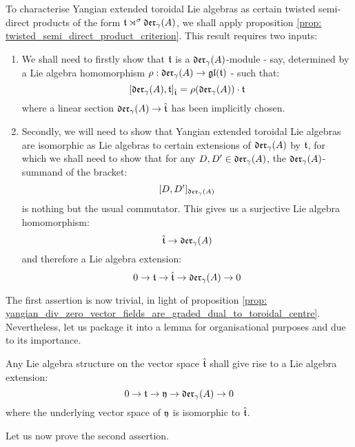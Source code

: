         To characterise Yangian extended toroidal Lie algebras as certain twisted semi-direct products of the form $\mathfrak{t} \rtimes^{\sigma} \mathfrak{der}_{\gamma}(A)$, we shall apply proposition \ref{prop: twisted_semi_direct_product_criterion}. This result requires two inputs:
        \begin{enumerate}
            \item We shall need to firstly show that $\mathfrak{t}$ is a $\mathfrak{der}_{\gamma}(A)$-module - say, determined by a Lie algebra homomorphism $\rho: \mathfrak{der}_{\gamma}(A) \to \mathfrak{gl}(\mathfrak{t})$ - such that:
                $$[\mathfrak{der}_{\gamma}(A), \mathfrak{t}]_{\hat{\mathfrak{t}}} = \rho(\mathfrak{der}_{\gamma}(A)) \cdot \mathfrak{t}$$
            where a linear section $\mathfrak{der}_{\gamma}(A) \to \hat{\mathfrak{t}}$ has been implicitly chosen.
            \item Secondly, we will need to show that Yangian extended toroidal Lie algebras are isomorphic as Lie algebras to certain extensions of $\mathfrak{der}_{\gamma}(A)$ by $\mathfrak{t}$, for which we shall need to show that for any $D, D' \in \mathfrak{der}_{\gamma}(A)$, the $\mathfrak{der}_{\gamma}(A)$-summand of the bracket:
                $$[D, D']_{\mathfrak{der}_{\gamma}(A)}$$
            is nothing but the usual commutator. This gives us a surjective Lie algebra homomorphism:
                $$\hat{\mathfrak{t}} \to \mathfrak{der}_{\gamma}(A)$$
            and therefore a Lie algebra extension:
                $$0 \to \mathfrak{t} \to \hat{\mathfrak{t}} \to \mathfrak{der}_{\gamma}(A) \to 0$$
        \end{enumerate}

        The first assertion is now trivial, in light of proposition \ref{prop: yangian_div_zero_vector_fields_are_graded_dual_to_toroidal_centre}. Nevertheless, let us package it into a lemma for organisational purposes and due to its importance.
        \begin{lemma} \label{lemma: yangian_extended_toroidal_lie_algebras_are_extensions}
            Any Lie algebra structure on the vector space $\hat{\mathfrak{t}}$ shall give rise to a Lie algebra extension:
                $$0 \to \mathfrak{t} \to \mathfrak{y} \to \mathfrak{der}_{\gamma}(A) \to 0$$
            where the underlying vector space of $\mathfrak{y}$ is isomorphic to $\hat{\mathfrak{t}}$. 
        \end{lemma}

        Let us now prove the second assertion. 

